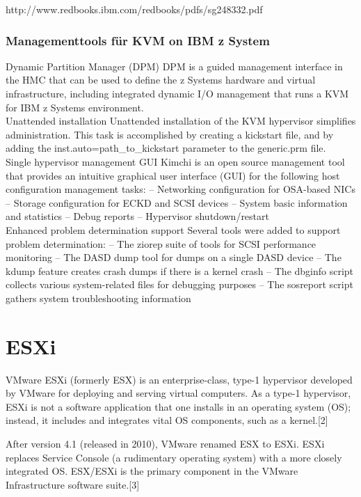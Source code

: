 \documentclass[14pt]{extreport}
\begin{document}
http://www.redbooks.ibm.com/redbooks/pdfs/sg248332.pdf


\subsubsection{Managementtools für KVM on IBM z System}
Dynamic Partition Manager (DPM)
DPM is a guided management interface in the HMC that can be used to define the 
z Systems hardware and virtual infrastructure, including integrated dynamic I/O 
management that runs a KVM for IBM z Systems environment.\\ 
Unattended installation
Unattended installation of the KVM hypervisor simplifies administration. This task is 
accomplished by creating a kickstart file, and by adding the 
inst.auto=path\_to\_kickstart
parameter to the 
generic.prm
 file.\\

Single hypervisor management GUI
Kimchi is an open source management tool that provides an intuitive graphical user 
interface (GUI) for the following host configuration management tasks:
–   Networking configuration for OSA-based NICs
–   Storage configuration for ECKD and SCSI devices
–   System basic information and statistics
–   Debug reports
–   Hypervisor shutdown/restart
\\
Enhanced problem determination support
Several tools were added to support problem determination:
–   The ziorep suite of tools for SCSI performance monitoring
–   The DASD dump tool for dumps on a single DASD device
–   The kdump feature creates crash dumps if there is a kernel crash
–   The dbginfo script collects various system-related files for debugging purposes
–   The sosreport script gathers system troubleshooting information

\section{ESXi}
VMware ESXi (formerly ESX) is an enterprise-class, type-1 hypervisor developed by VMware for deploying and serving virtual computers. As a type-1 hypervisor, ESXi is not a software application that one installs in an operating system (OS); instead, it includes and integrates vital OS components, such as a kernel.[2]

After version 4.1 (released in 2010), VMware renamed ESX to ESXi. ESXi replaces Service Console (a rudimentary operating system) with a more closely integrated OS. ESX/ESXi is the primary component in the VMware Infrastructure software suite.[3]
\end{document}

